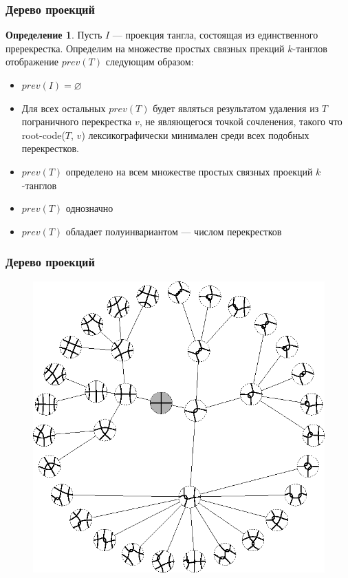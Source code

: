\documentclass[dvips, intlimits, 9pt, unicode, notheorems]{beamer}
\theoremstyle{plain}
\theoremstyle{definition}
\newtheorem{definition}{Определение}
\begin{document}
	\begin{frame}
		\frametitle{Дерево проекций}

		\begin{definition}
			Пусть $I$ --- проекция тангла, состоящая из единственного пререкрестка. Определим на множестве простых связных
			прекций $k$-танглов отображение $prev(T)$ следующим образом:
			\begin{itemize}
				\item
				$prev(I) = \varnothing$

				\item
				Для всех остальных $prev(T)$ будет являться результатом удаления из $T$ пограничного перекрестка $v$, не
				являющегося точкой сочленения, такого что root-code($T$, $v$) лексикографически минимален среди всех подобных
				перекрестков.
			\end{itemize}
		\end{definition}

		\begin{itemize}
			\item
			$prev(T)$ определено на всем множестве простых связных проекций $k$-танглов

			\item
			$prev(T)$ однозначно

			\item
			$prev(T)$ обладает полуинвариантом --- числом перекрестков
		\end{itemize}
	\end{frame}

	\begin{frame}
		\frametitle{Дерево проекций}

		\begin{figure}[ht]
			\centering
			\includegraphics[scale = 0.9]{c/genealogical-tree.eps}
		\end{figure}
	\end{frame}
\end{document}
